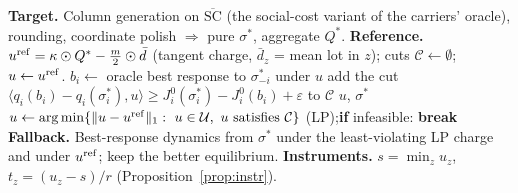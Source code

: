 \documentclass[11pt]{article}
\theoremstyle{definition}
\theoremstyle{remark}
\newcommand{\cU}{\mathcal{U}}
\newcommand{\ip}[2]{\langle #1,#2\rangle}
\newcommand{\dbar}{\bar d}
\newcommand{\SCbar}{\overline{\mathrm{SC}}}
\begin{document}
\begin{algorithm}[t]
\caption{DIP: dual implementation pricing}\label{alg:dip}
\begin{algorithmic}[1]
\State \textbf{Target.} Column generation on $\SCbar$ (the social-cost variant of the carriers' oracle), rounding, coordinate polish $\Rightarrow$ pure $\sigma^*$, aggregate $Q^*$.
\State \textbf{Reference.} $u^{\rm ref}=\kappa\odot Q^*-\tfrac m2\odot\dbar$ (tangent charge, $\dbar_z$ = mean lot in $z$); cuts $\mathcal C\gets\emptyset$; $u\gets u^{\rm ref}$.
   $b_i\gets$ oracle best response to $\sigma^*_{-i}$ under $u$ 
      add the cut $\ip{q_i(b_i)-q_i(\sigma^*_i)}{u}\ge J^0_i(\sigma^*_i)-J^0_i(b_i)+\varepsilon$ to $\mathcal C$\EndIf
  \EndFor
   \Return $u$, $\sigma^*$ \EndIf
  \State $u\gets\arg\min\{\|u-u^{\rm ref}\|_1:\ u\in\cU,\ u\text{ satisfies }\mathcal C\}$ (LP);\quad \textbf{if} infeasible: \textbf{break}
\EndFor
\State \textbf{Fallback.} Best-response dynamics from $\sigma^*$ under the least-violating LP charge and under $u^{\rm ref}$; keep the better equilibrium.
\State \textbf{Instruments.} $s=\min_zu_z$, $t_z=(u_z-s)/r$ (Proposition~\ref{prop:instr}).
\end{algorithmic}
\end{algorithm}
\end{document}

